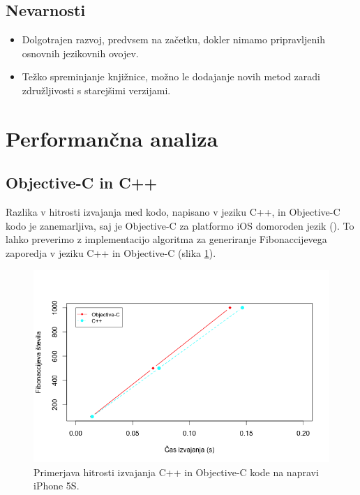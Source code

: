 \subsection{Nevarnosti}

\begin{itemize}
  \item Dolgotrajen razvoj, predvsem na začetku, dokler nimamo pripravljenih osnovnih jezikovnih ovojev.
  \item Težko spreminjanje knjižnice, možno le dodajanje novih metod zaradi združljivosti s starejšimi verzijami.
\end{itemize}

\section{Performančna analiza}

\subsection{Objective-C in C++}

Razlika v hitrosti izvajanja med kodo, napisano v jeziku C++, in Objective-C kodo je zanemarljiva, saj je Objective-C za platformo iOS domoroden jezik (). To lahko preverimo z implementacijo algoritma za generiranje Fibonaccijevega zaporedja v jeziku C++ in Objective-C (slika \ref{fig:ios-performance}).

\begin{figure}
 \includegraphics[width=\linewidth]{ios-performance}
 \caption{Primerjava hitrosti izvajanja C++ in Objective-C kode na napravi iPhone 5S.}
 \label{fig:ios-performance}
\end{figure}

